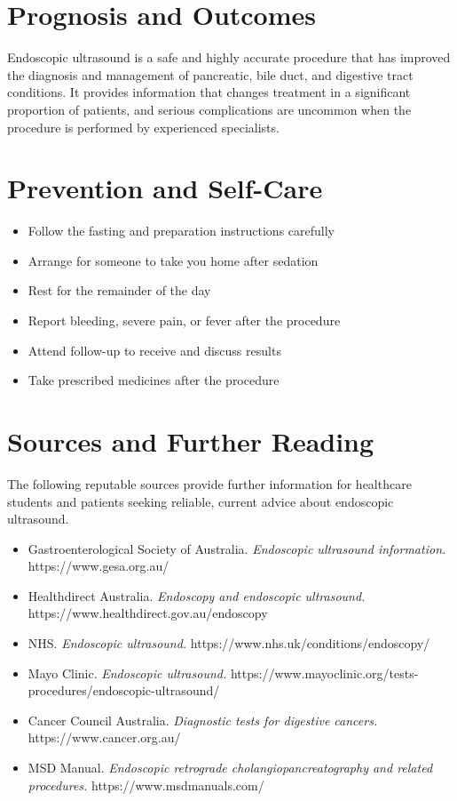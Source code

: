 \section*{Prognosis and Outcomes}
Endoscopic ultrasound is a safe and highly accurate procedure that has improved the diagnosis and management of pancreatic, bile duct, and digestive tract conditions. It provides information that changes treatment in a significant proportion of patients, and serious complications are uncommon when the procedure is performed by experienced specialists.

\section*{Prevention and Self-Care}
\begin{itemize}
    \item Follow the fasting and preparation instructions carefully
    \item Arrange for someone to take you home after sedation
    \item Rest for the remainder of the day
    \item Report bleeding, severe pain, or fever after the procedure
    \item Attend follow-up to receive and discuss results
    \item Take prescribed medicines after the procedure
\end{itemize}

\section*{Sources and Further Reading}
The following reputable sources provide further information for healthcare students and patients seeking reliable, current advice about endoscopic ultrasound.
\begin{itemize}
    \item Gastroenterological Society of Australia. \textit{Endoscopic ultrasound information.} https://www.gesa.org.au/
    \item Healthdirect Australia. \textit{Endoscopy and endoscopic ultrasound.} https://www.healthdirect.gov.au/endoscopy
    \item NHS. \textit{Endoscopic ultrasound.} https://www.nhs.uk/conditions/endoscopy/
    \item Mayo Clinic. \textit{Endoscopic ultrasound.} https://www.mayoclinic.org/tests-procedures/endoscopic-ultrasound/
    \item Cancer Council Australia. \textit{Diagnostic tests for digestive cancers.} https://www.cancer.org.au/
    \item MSD Manual. \textit{Endoscopic retrograde cholangiopancreatography and related procedures.} https://www.msdmanuals.com/
\end{itemize}
